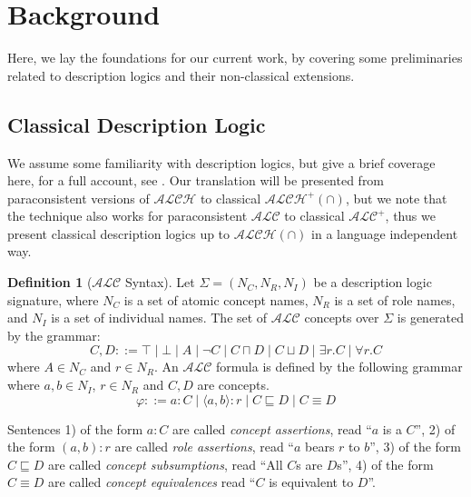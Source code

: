 \documentclass[letterpaper]{article} %
\theoremstyle{definition}
\theoremstyle{definition}
\newtheorem{definition}{Definition}
\theoremstyle{definition}
\theoremstyle{definition}
\theoremstyle{definition}
\newcommand{\isa}{\mathbin{{:}}}
\begin{document}




\section{Background}

Here, we lay the foundations for our current work, by covering some preliminaries related to description logics and their non-classical extensions.


\subsection{Classical Description Logic}

We assume some familiarity with description logics, but give a brief coverage here, for a full account, see \cite{DBLP:conf/dlog/2003handbook}. Our translation will be presented from paraconsistent versions of $\mathcal{ALCH}$ to classical $\mathcal{ALCH^+(\cap)}$, but we note that the technique also works for paraconsistent $\mathcal{ALC}$ to classical $\mathcal{ALC^+}$, thus we present classical description logics up to $\mathcal{ALCH(\cap)}$ in a language independent way.
\begin{definition}[$\mathcal{ALC}$ Syntax] 
Let $\Sigma=(N_C,N_R,N_I)$ be a description logic signature, where $N_C$ is a set of atomic concept names, $N_R$ is a set of role names, and $N_I$ is a set of individual names. The set of $\mathcal{ALC}$ concepts over $\Sigma$ is generated by the grammar:
\[
C,D ::= \top \mid \bot \mid A \mid \lnot C \mid C\sqcap D
\mid C\sqcup D \mid \exists r.C \mid \forall r.C
\]
where $A\in N_C$ and $r\in N_R$. An $\mathcal{ALC}$ formula is defined by the following grammar where $a, b \in N_I$, $r \in N_R$ and $C, D$ are concepts. 
\[
\varphi ::= a \isa C \mid \langle a, b \rangle \isa r \mid C \sqsubseteq D \mid C \equiv D
\] 
\end{definition}
\noindent Sentences 1) of the form $a \isa C$ are called {\it concept assertions}, read ``$a$ is a $C$'',
2) of the form $(a, b) \isa r$ are called {\it role assertions}, read ``$a$ bears $r$ to $b$'', 3) of the form $C \sqsubseteq D$ are called {\it concept subsumptions}, read ``All $C$s are $D$s'', 4) of the form $C \equiv D$ are called {\it concept equivalences} read ``$C$ is equivalent to $D$''.
\end{document}
